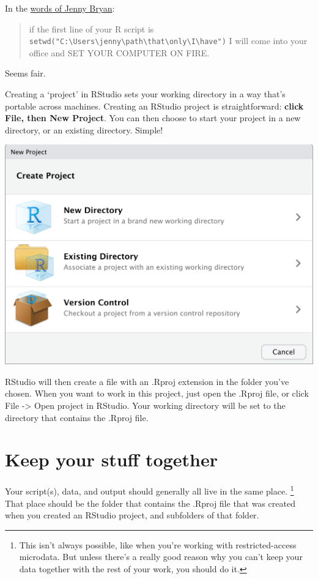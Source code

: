 \documentclass[]{book}
\let\rmarkdownfootnote\footnote%
\def\footnote{\protect\rmarkdownfootnote}
\begin{document}
In the \href{https://www.tidyverse.org/articles/2017/12/workflow-vs-script/}{words of Jenny Bryan}:

\begin{quote}
if the first line of your R script is \texttt{setwd("C:\textbackslash{}Users\textbackslash{}jenny\textbackslash{}path\textbackslash{}that\textbackslash{}only\textbackslash{}I\textbackslash{}have")} I will come into your office and SET YOUR COMPUTER ON FIRE.
\end{quote}

Seems fair.

Creating a `project' in RStudio sets your working directory in a way that's portable across machines. Creating an RStudio project is straightforward: \textbf{click File, then New Project}. You can then choose to start your project in a new directory, or an existing directory. Simple!

\begin{center}\includegraphics[width=0.66\linewidth]{atlas/rstudio_newproject} \end{center}

RStudio will then create a file with an .Rproj extension in the folder you've chosen. When you want to work in this project, just open the .Rproj file, or click File -\textgreater{} Open project in RStudio. Your working directory will be set to the directory that contains the .Rproj file.

\hypertarget{keep-your-stuff-together}{%
\section{Keep your stuff together}\label{keep-your-stuff-together}}

Your script(s), data, and output should generally all live in the same place. \footnote{This isn't always possible, like when you're working with restricted-access microdata. But unless there's a really good reason why you can't keep your data together with the rest of your work, you should do it.} That place should be the folder that contains the .Rproj file that was created when you created an RStudio project, and subfolders of that folder.
\end{document}
